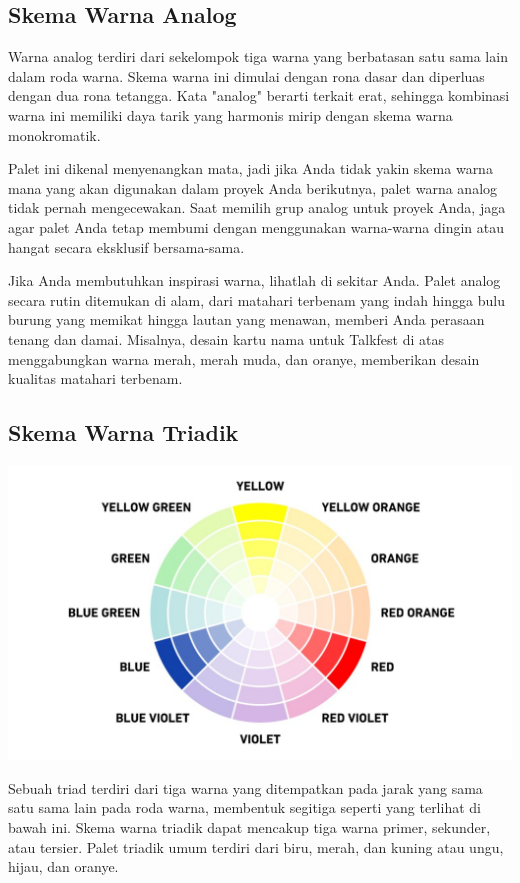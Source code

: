 \documentclass[a4paper]{article}
\begin{document}
\subsection{Skema Warna Analog}
Warna analog terdiri dari sekelompok tiga warna yang berbatasan satu sama lain dalam roda warna. Skema warna ini dimulai dengan rona dasar dan diperluas dengan dua rona tetangga. Kata "analog" berarti terkait erat, sehingga kombinasi warna ini memiliki daya tarik yang harmonis mirip dengan skema warna monokromatik.

Palet ini dikenal menyenangkan mata, jadi jika Anda tidak yakin skema warna mana yang akan digunakan dalam proyek Anda berikutnya, palet warna analog tidak pernah mengecewakan. Saat memilih grup analog untuk proyek Anda, jaga agar palet Anda tetap membumi dengan menggunakan warna-warna dingin atau hangat secara eksklusif bersama-sama.

Jika Anda membutuhkan inspirasi warna, lihatlah di sekitar Anda. Palet analog secara rutin ditemukan di alam, dari matahari terbenam yang indah hingga bulu burung yang memikat hingga lautan yang menawan, memberi Anda perasaan tenang dan damai. Misalnya, desain kartu nama untuk Talkfest di atas menggabungkan warna merah, merah muda, dan oranye, memberikan desain kualitas matahari terbenam.

\subsection{Skema Warna Triadik}
\begin{center}
  \includegraphics[width=\widthtext]{resources/triadic.jpg}
\end{center}
Sebuah triad terdiri dari tiga warna yang ditempatkan pada jarak yang sama satu sama lain pada roda warna, membentuk segitiga seperti yang terlihat di bawah ini. Skema warna triadik dapat mencakup tiga warna primer, sekunder, atau tersier. Palet triadik umum terdiri dari biru, merah, dan kuning atau ungu, hijau, dan oranye.
\end{document}

